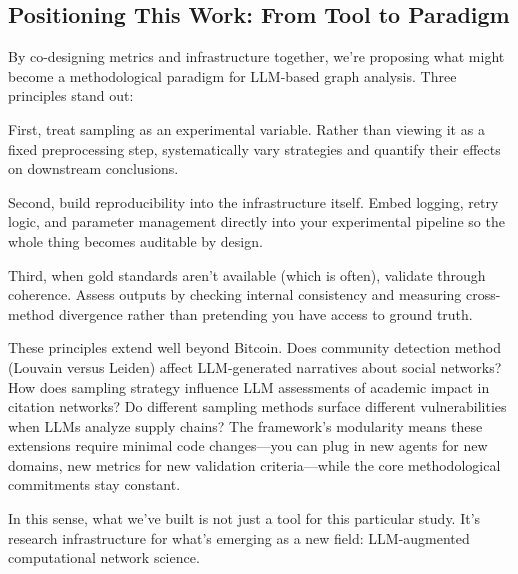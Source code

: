\subsection{Positioning This Work: From Tool to Paradigm}

By co-designing metrics and infrastructure together, we're proposing what might become a methodological paradigm for LLM-based graph analysis. Three principles stand out:

First, treat sampling as an experimental variable. Rather than viewing it as a fixed preprocessing step, systematically vary strategies and quantify their effects on downstream conclusions.

Second, build reproducibility into the infrastructure itself. Embed logging, retry logic, and parameter management directly into your experimental pipeline so the whole thing becomes auditable by design.

Third, when gold standards aren't available (which is often), validate through coherence. Assess outputs by checking internal consistency and measuring cross-method divergence rather than pretending you have access to ground truth.

These principles extend well beyond Bitcoin. Does community detection method (Louvain versus Leiden) affect LLM-generated narratives about social networks? How does sampling strategy influence LLM assessments of academic impact in citation networks? Do different sampling methods surface different vulnerabilities when LLMs analyze supply chains? The framework's modularity means these extensions require minimal code changes---you can plug in new agents for new domains, new metrics for new validation criteria---while the core methodological commitments stay constant.

In this sense, what we've built is not just a tool for this particular study. It's research infrastructure for what's emerging as a new field: LLM-augmented computational network science.





